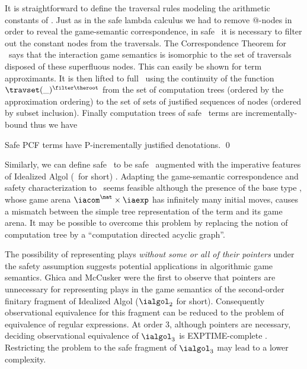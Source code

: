 It is straightforward to define the traversal rules modeling the
arithmetic constants of \pcf. Just as in the safe lambda calculus we
had to remove @-nodes in order to reveal the game-semantic
correspondence, in safe \pcf\ it is necessary to filter out the
constant nodes from the traversals. The Correspondence Theorem for
\pcf\ says that the interaction game semantics is isomorphic to the
set of traversals disposed of these superfluous nodes. This can
easily be shown for term approximants. It is then lifted to full
\pcf\ using the continuity of the function $\travset(\_)^{\filter
\theroot}$ from the set of computation trees (ordered by the
approximation ordering) to the set of sets of justified sequences of
nodes (ordered by subset inclusion). Finally computation trees of
safe \pcf\ terms are incrementally-bound thus we have
\begin{theorem}
\label{thm:safepcfpincr} Safe PCF terms have P-incrementally
justified denotations. \qed
\end{theorem}


Similarly, we can define safe \ialgol\ to be safe \pcf\ augmented
with the imperative features of Idealized Algol (\ialgol\ for short)
\cite{Reynolds81}.  Adapting the game-semantic correspondence and
safety characterization to \ialgol\ seems feasible although the
presence of the base type \iavar, whose game arena $\iacom^{\nat}
\times \iaexp$ has infinitely many initial moves, causes a mismatch
between the simple tree representation of the term and its game
arena. It may be possible to overcome this problem by replacing the
notion of computation tree by a ``computation directed acyclic
graph''.

The possibility of representing plays \emph{without some or all of
  their pointers} under the safety assumption suggests potential
applications in algorithmic game semantics. Ghica and McCusker
\cite{ghicamccusker00} were the first to observe that pointers are
unnecessary for representing plays in the game semantics of the
second-order finitary fragment of Idealized Algol ($\ialgol_2$ for
short). Consequently observational equivalence for this fragment can
be reduced to the problem of equivalence of regular expressions.  At
order $3$, although pointers are necessary, deciding observational
equivalence of $\ialgol_3$ is EXPTIME-complete
\cite{DBLP:journals/apal/Ong04,DBLP:conf/fossacs/MurawskiW05}.
Restricting the problem to the safe fragment of $\ialgol_3$ may lead
to a lower complexity.


